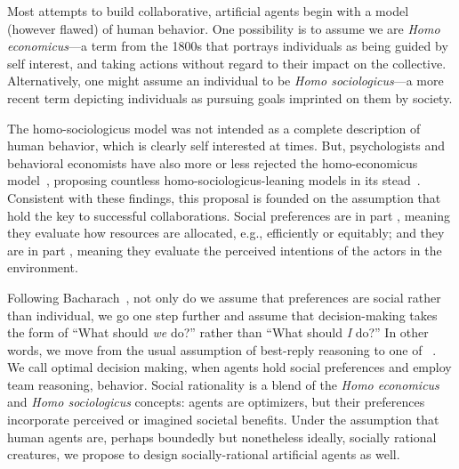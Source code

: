 Most attempts to build collaborative, artificial agents begin with a
model (however flawed) of human behavior.
%
One possibility is to assume we are \emph{Homo economicus}---a term
from the 1800s that portrays individuals as being guided by self interest,
and taking actions without regard to their impact on the collective.
Alternatively, one might assume an individual to be \emph{Homo
  sociologicus}---a more recent term depicting individuals as pursuing
goals imprinted on them by society.

The homo-sociologicus model was not intended as a complete description
of human behavior, which is clearly self interested at times.  But,
psychologists and behavioral economists have also more or less
rejected the homo-economicus model~\cite{Kahnemann, etc.}, proposing
countless homo-sociologicus-leaning models in its stead~\cite{ADD
  CITATIONS}.
%
Consistent with these findings, this proposal is founded on the
assumption that  hold the key to successful
collaborations.
%
Social preferences are in part , meaning they
evaluate how resources are allocated, e.g., efficiently or equitably;
and they are in part , meaning they evaluate the
perceived intentions of the actors in the environment.

Following Bacharach~\cite{2006}, not only do we assume that
preferences are social rather than individual, we go one step further
and assume that decision-making takes the form of ``What should
\emph{we\/} do?'' rather than ``What should \emph{I\/} do?''  In other
words, we move from the usual assumption of best-reply reasoning to
one of ~\cite{TEAM REASONING: Bacharach 1999}.
We call optimal decision making, when agents hold social preferences
and employ team reasoning,  behavior.  Social
rationality is a blend of the \emph{Homo economicus\/} and \emph{Homo
  sociologicus\/} concepts: agents are optimizers, but their
preferences incorporate perceived or imagined societal benefits.
%
Under the assumption that human agents are, perhaps boundedly but
nonetheless ideally, socially rational creatures, we propose to design
socially-rational artificial agents as well.


